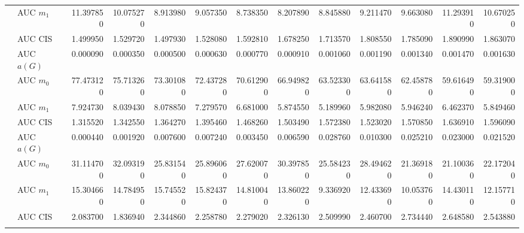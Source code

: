 \begin{table}[htbp]
\begin{tabular}{llrrrrrrrrrrr}
    & AUC $m_1$ & 11.397850 & 10.075270 & 8.913980 & 9.057350 & 8.738350 & 8.207890 & 8.845880 & 9.211470 & 9.663080 & 11.293910 & 10.670250 \\
    & AUC CIS & 1.499950 & 1.529720 & 1.497930 & 1.528080 & 1.592810 & 1.678250 & 1.713570 & 1.808550 & 1.785090 & 1.890990 & 1.863070 \\
    \addlinespace
    \multirow{4}{*}{degree} & AUC $a(G)$ & 0.000090 & 0.000350 & 0.000500 & 0.000630 & 0.000770 & 0.000910 & 0.001060 & 0.001190 & 0.001340 & 0.001470 & 0.001630 \\
    & AUC $m_0$ & 77.473120 & 75.713260 & 73.301080 & 72.437280 & 70.612900 & 66.949820 & 63.523300 & 63.641580 & 62.458780 & 59.616490 & 59.319000 \\
    & AUC $m_1$ & 7.924730 & 8.039430 & 8.078850 & 7.279570 & 6.681000 & 5.874550 & 5.189960 & 5.982080 & 5.946240 & 6.462370 & 5.849460 \\
    & AUC CIS & 1.315520 & 1.342550 & 1.364270 & 1.395460 & 1.468260 & 1.503490 & 1.572380 & 1.523020 & 1.570850 & 1.636910 & 1.596090 \\
    \addlinespace
    \multirow{4}{*}{random} & AUC $a(G)$ & 0.000440 & 0.001920 & 0.007600 & 0.007240 & 0.003450 & 0.006590 & 0.028760 & 0.010300 & 0.025210 & 0.023000 & 0.021520 \\
    & AUC $m_0$ & 31.114700 & 32.093190 & 25.831540 & 25.896060 & 27.620070 & 30.397850 & 25.584230 & 28.494620 & 21.369180 & 21.100360 & 22.172040 \\
    & AUC $m_1$ & 15.304660 & 14.784950 & 15.745520 & 15.824370 & 14.810040 & 13.860220 & 9.336920 & 12.433690 & 10.053760 & 14.430110 & 12.157710 \\
    & AUC CIS & 2.083700 & 1.836940 & 2.344860 & 2.258780 & 2.279020 & 2.326130 & 2.509990 & 2.460700 & 2.734440 & 2.648580 & 2.543880 \\
    \addlinespace
    \bottomrule
  \end{tabular}
\end{table}

